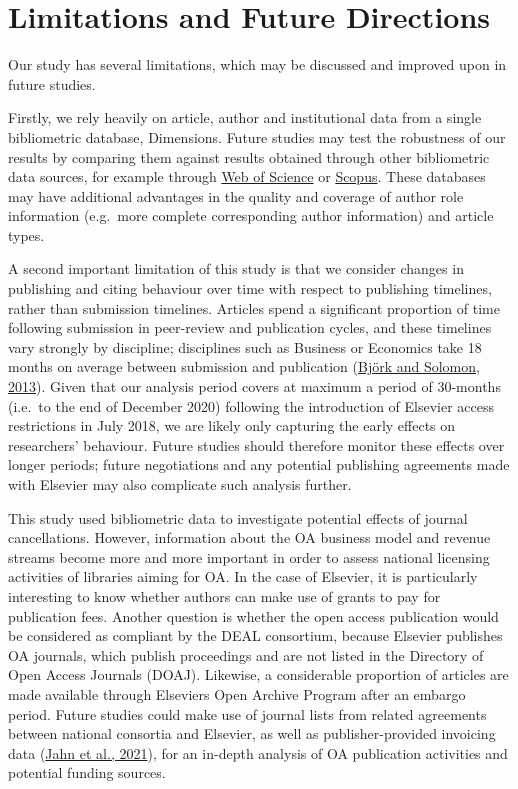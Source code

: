 \documentclass[
]{article}
\begin{document}
\hypertarget{limitations-and-future-directions}{%
\section{Limitations and Future Directions}\label{limitations-and-future-directions}}

Our study has several limitations, which may be discussed and improved upon in future studies.

Firstly, we rely heavily on article, author and institutional data from a single bibliometric database, Dimensions. Future studies may test the robustness of our results by comparing them against results obtained through other bibliometric data sources, for example through \href{https://www.webofknowledge.com/}{Web of Science} or \href{https://www.scopus.com}{Scopus}. These databases may have additional advantages in the quality and coverage of author role information (e.g.~more complete corresponding author information) and article types.

A second important limitation of this study is that we consider changes in publishing and citing behaviour over time with respect to publishing timelines, rather than submission timelines. Articles spend a significant proportion of time following submission in peer-review and publication cycles, and these timelines vary strongly by discipline; disciplines such as Business or Economics take 18 months on average between submission and publication (\href{https://doi.org/10.1016/j.joi.2013.09.001}{Björk and Solomon, 2013}). Given that our analysis period covers at maximum a period of 30-months (i.e.~to the end of December 2020) following the introduction of Elsevier access restrictions in July 2018, we are likely only capturing the early effects on researchers' behaviour. Future studies should therefore monitor these effects over longer periods; future negotiations and any potential publishing agreements made with Elsevier may also complicate such analysis further.

This study used bibliometric data to investigate potential effects of journal cancellations. However, information about the OA business model and revenue streams become more and more important in order to assess national licensing activities of libraries aiming for OA. In the case of Elsevier, it is particularly interesting to know whether authors can make use of grants to pay for publication fees. Another question is whether the open access publication would be considered as compliant by the DEAL consortium, because Elsevier publishes OA journals, which publish proceedings and are not listed in the Directory of Open Access Journals (DOAJ). Likewise, a considerable proportion of articles are made available through Elsevier\textquotesingle s Open Archive Program after an embargo period. Future studies could make use of journal lists from related agreements between national consortia and Elsevier, as well as publisher-provided invoicing data (\href{https://doi.org/10.1002/asi.24549}{Jahn et al., 2021}), for an in-depth analysis of OA publication activities and potential funding sources.
\end{document}
